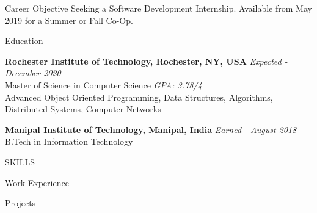 \documentclass{resume} %
\begin{document}
    \begin{rSection}{Career Objective}
     Seeking a Software Development Internship. Available from May 2019 for a Summer or Fall Co-Op.
    \end{rSection}

    \begin{rSection}{Education}
    
        {\bf Rochester Institute of Technology, Rochester, NY, USA} \hfill {\em Expected - December 2020} 
        \\ Master of Science in Computer Science 
        \hfill {\em GPA: 3.78/4} \\
        Advanced Object Oriented Programming, Data Structures, Algorithms, Distributed Systems, Computer Networks
        
        {\bf Manipal Institute of Technology, Manipal, India} 
        \hfill {\em Earned - August 2018} 
        \\ B.Tech in Information Technology
    \end{rSection}



    \begin{rSection}{SKILLS}
        
    \end{rSection}


    \begin{rSection}{Work Experience}
        
        
    \end{rSection}


    \begin{rSection}{Projects}
        
        
        
        
    \end{rSection}
\end{document}
